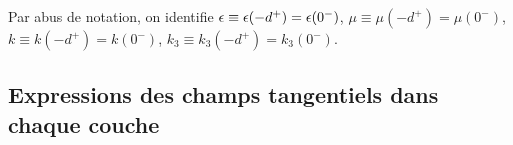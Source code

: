     Par abus de notation, on identifie  \(\epsilon\equiv \epsilon(-d^+)=\epsilon(0^-)\), \(\mu\equiv\mu(-d^+)=\mu(0^-)\), \(k\equiv k(-d^+)=k(0^-)\), \(k_3 \equiv k_3(-d^+) = k_3(0^-)\).


    \subsection{Expressions des champs tangentiels dans chaque couche}

